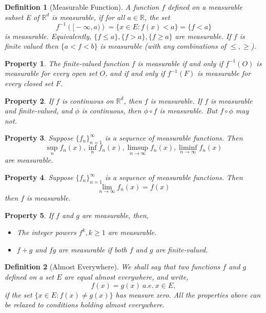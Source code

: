 \documentclass{report}
\newtheorem{defn}{Definition}
\newtheorem{property}{Property}
\newcommand{\reals}{\mathbb{R}}
\newcommand{\set}[1]{\big\lbrace #1 \big\rbrace}
\begin{document}
\begin{defn}[Measurable Function]
	A function $f$ defined on a measurable subset E of $\reals^d$ is measurable,
	if for all $ a \in \reals$, the set
	$$f^{-1}(\big[-\infty, a\big)) = \set{x \in E: f(x) < a} = \set{f < a}$$ is measurable. Equivalently, $\set{f \leq a}, \set{f > a}, \set{f \geq a}$ are measurable. If $f$ is finite valued then $\set{a < f < b}$ is measurable (with any combinations of $\leq, \geq$).
\end{defn} 
\begin{property}
	The finite-valued function $f$ is measurable if and only if $f^{-1}(O)$ is measurable for every open set $O$, and if and only if $f^{-1}(F)$ is measurable for every closed set $F$.
\end{property}
\begin{property}
	If $f$ is continuous on $\reals^d$, then $f$ is measurable. If $f$ is measurable and finite-valued, and $\phi$ is continuous, then  $\phi \circ f$ is measurable. But $f \circ \phi$ may not.
\end{property}
\begin{property}
	Suppose $\set{f_n}_{n=1}^\infty$ is a sequence of measurable functions. Then $$\sup_n f_n(x), \inf_n f_n(x), \limsup_{n \rightarrow \infty} f_n(x), \liminf_{n \rightarrow \infty} f_n(x)  $$ are measurable.
\end{property}
\begin{property}
	Suppose $\set{f_n}_{n=1}^\infty$ is a sequence of measurable functions. Then $$\lim_{n \rightarrow \infty} f_n(x) = f(x) $$ then $f$ is measurable.
\end{property}
\begin{property}
	If $f$ and $g$ are measurable, then,
	\begin{itemize}
		\item The integer powers $f^k, k \geq 1$ are measurable.
		\item $f + g$ and $fg$ are measurable if both $f$ and $g$ are finite-valued.
	\end{itemize}
\end{property}

\begin{defn}[Almost Everywhere]
	We shall say that two functions $f$ and $g$ defined on a set $E$ are equal almost everywhere, and write,
	$$ f(x) = g(x)\ a.e.\ x \in E,$$
	if the set $\set{x \in E : f(x) \neq g(x)}$ has measure zero. All the properties above can be relaxed to conditions holding almost everywhere.
\end{defn}
\end{document}
